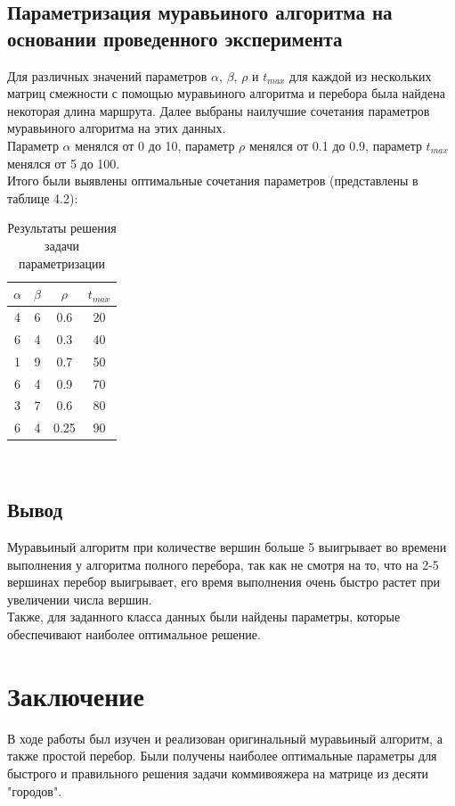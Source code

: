 \documentclass[12pt]{report}
\begin{document}
\section{Параметризация муравьиного алгоритма на основании проведенного эксперимента}	

Для различных значений параметров $\alpha$, $\beta$, $\rho$ и $t_{max}$ для каждой из нескольких матриц смежности с помощью муравьиного алгоритма и перебора была найдена некоторая длина маршрута. Далее выбраны наилучшие сочетания параметров муравьиного алгоритма на этих данных.\\
Параметр $\alpha$ менялся от 0 до 10, параметр $\rho$ менялся от 0.1 до 0.9, параметр $t_{max}$ менялся от 5 до 100.\\
Итого были выявлены оптимальные сочетания параметров (представлены в таблице 4.2):\\

\begin{table}[H]
	\caption{Результаты решения задачи параметризации}
	\begin{center}
		
	\begin{tabular}{|c|c|c|c|}
		\hline
		$\alpha$ &$\beta$ & $\rho$ & $t_{max}$ \\\hline
		4&6&0.6&20\\
		6&4&0.3&40\\
		 1&9&0.7&50\\
		 6&4&0.9&70\\
		 3&7&0.6&80\\
		 6&4&0.25&90\\
		 \hline
	\end{tabular}
\end{center}
\end{table} 
\
 

\section{Вывод}

Муравьиный алгоритм при количестве вершин больше 5 выигрывает во времени выполнения у алгоритма полного перебора, так как не смотря на то, что на 2-5 вершинах перебор выигрывает, его время выполнения очень быстро растет при увеличении числа вершин.\\

Также, для заданного класса данных были найдены параметры, которые обеспечивают наиболее оптимальное решение.\\



\chapter*{Заключение}
В ходе работы был изучен и реализован оригинальный муравьиный алгоритм, а также простой перебор. Были получены наиболее оптимальные параметры для быстрого и правильного решения задачи коммивояжера на матрице из десяти "городов".
\end{document}

